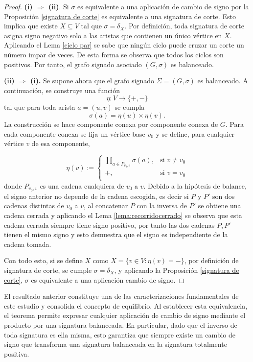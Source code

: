 \documentclass[11pt,a4paper,spanish]{report}
\theoremstyle{plain}
\begin{document}
\begin{proof}
\noindent \textbf{(i) $\Rightarrow$ (ii)}. 
Si $\sigma$ es equivalente a una aplicación de cambio de signo por la Proposición \ref{signatura de corte} es equivalente a una signatura de corte. Esto implica que existe $X\subseteq V$ tal que
$\sigma = \delta_X$. 
Por definición, toda signatura de corte asigna signo negativo solo a las aristas que contienen un único vértice en $X$. Aplicando el Lema \ref{ciclo par} se sabe que ningún ciclo puede cruzar un corte un número impar de veces. De esta forma se observa que todos los ciclos son positivos. Por tanto, el grafo signado asociado $(G,\sigma)$ es balanceado.

\medskip
\noindent \textbf{(ii) $\Rightarrow$ (i).} Se supone ahora que el grafo signado \(\Sigma=(G,\sigma)\) es balanceado. A continuación, se construye una función 
\[
\eta:V\longrightarrow\{+,-\}
\]
tal que para toda arista \(a=(u,v)\) se cumpla
\[
\sigma(a)=\eta(u)\times\eta(v).
\]
La construcción se hace componente conexa por componente conexa de \(G\). Para cada componente conexa se fija un vértice base \(v_0\) y se define, para cualquier vértice \(v\) de esa componente,

\[
\eta(v):=
\begin{cases}
\prod_{a\in P_{v_0,v}} \sigma(a), & \text{si } v\neq v_0\\
+, & \text{si } v= v_0\\
\end{cases}
\]
donde \(P_{v_0,v}\) es una cadena cualquiera de \(v_0\) a \(v\). Debido a la hipótesis de balance, el signo anterior no depende de la cadena escogida, es decir si \(P\) y \(P'\) son dos cadenas distintas de \(v_0\) a \(v\), al concatenar \(P\) con la inversa de \(P'\) se obtiene una cadena cerrada y aplicando el Lema \ref{lema:recorridocerrado} se observa que esta cadena cerrada siempre tiene signo positivo, por tanto las dos cadenas $P, P'$ tienen el mismo signo y esto demuestra que el signo es independiente de la cadena tomada.


Con todo esto, si se define $X$ como $X=\{v\in V:\eta(v)=-\}$, por definición de signatura de corte, se cumple $\sigma=\delta_X$, y aplicando la Proposición \ref{signatura de corte}, $\sigma$ es equivalente a una aplicación cambio de signo.
\end{proof}

El resultado anterior constituye una de las caracterizaciones fundamentales de este estudio y consolida el concepto de equilibrio. Al establecer esta equivalencia, el teorema permite expresar cualquier aplicación de cambio de signo mediante el producto por una signatura balanceada. En particular, dado que el inverso de toda signatura es ella misma, esto garantiza que siempre existe un cambio de signo que transforma una signatura balanceada en la signatura totalmente positiva.
\end{document}
